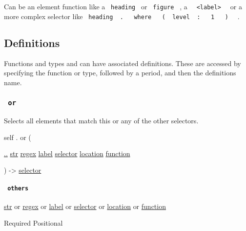 Can be an element function like a \texttt{\ heading\ } or
\texttt{\ figure\ } , a
\texttt{\ }{\texttt{\ \textless{}label\textgreater{}\ }}\texttt{\ } or a
more complex selector like
\texttt{\ heading\ }{\texttt{\ .\ }}\texttt{\ }{\texttt{\ where\ }}\texttt{\ }{\texttt{\ (\ }}\texttt{\ level\ }{\texttt{\ :\ }}\texttt{\ }{\texttt{\ 1\ }}\texttt{\ }{\texttt{\ )\ }}\texttt{\ }
.

\subsection{\texorpdfstring{{ Definitions
}}{ Definitions }}\label{definitions}

\label{definitions-tooltip}
Functions and types and can have associated definitions. These are
accessed by specifying the function or type, followed by a period, and
then the definition\textquotesingle s name.

\subsubsection{\texorpdfstring{\texttt{\ or\ }}{ or }}\label{definitions-or}

Selects all elements that match this or any of the other selectors.

self { . } { or } (

{ \hyperref[definitions-or-parameters-others]{..}
\href{/docs/reference/foundations/str/}{str}
\href{/docs/reference/foundations/regex/}{regex}
\href{/docs/reference/foundations/label/}{label}
\href{/docs/reference/foundations/selector/}{selector}
\href{/docs/reference/introspection/location/}{location}
\href{/docs/reference/foundations/function/}{function} }

) -\textgreater{} \href{/docs/reference/foundations/selector/}{selector}

\paragraph{\texorpdfstring{\texttt{\ others\ }}{ others }}\label{definitions-or-others}

\href{/docs/reference/foundations/str/}{str} {or}
\href{/docs/reference/foundations/regex/}{regex} {or}
\href{/docs/reference/foundations/label/}{label} {or}
\href{/docs/reference/foundations/selector/}{selector} {or}
\href{/docs/reference/introspection/location/}{location} {or}
\href{/docs/reference/foundations/function/}{function}

{Required} {{ Positional }}

